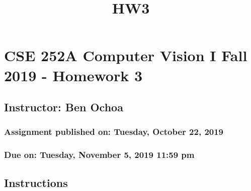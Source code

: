 \documentclass[11pt]{article}
\title{HW3}
\begin{document}
    
    
    \maketitle
    
    

    
    \hypertarget{cse-252a-computer-vision-i-fall-2019---homework-3}{%
\section{CSE 252A Computer Vision I Fall 2019 - Homework
3}\label{cse-252a-computer-vision-i-fall-2019---homework-3}}

\hypertarget{instructor-ben-ochoa}{%
\subsection{Instructor: Ben Ochoa}\label{instructor-ben-ochoa}}

\hypertarget{assignment-published-on-tuesday-october-22-2019}{%
\subsubsection{Assignment published on: Tuesday, October 22,
2019}\label{assignment-published-on-tuesday-october-22-2019}}

\hypertarget{due-on-tuesday-november-5-2019-1159-pm}{%
\subsubsection{Due on: Tuesday, November 5, 2019 11:59
pm}\label{due-on-tuesday-november-5-2019-1159-pm}}

\hypertarget{instructions}{%
\subsection{Instructions}\label{instructions}}
\end{document}
